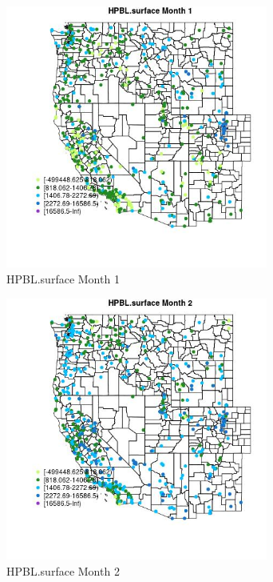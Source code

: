 \begin{figure} 
\centering  
\includegraphics[width=0.77\textwidth]{Code_Outputs/Report_ML_input_PM25_Step4_part_e_de_duplicated_aves_compiled_2019-05-14wNAs_MapObsMo1HPBLsurface.jpg} 
\caption{\label{fig:Report_ML_input_PM25_Step4_part_e_de_duplicated_aves_compiled_2019-05-14wNAsMapObsMo1HPBLsurface}HPBL.surface Month 1} 
\end{figure} 
 

\begin{figure} 
\centering  
\includegraphics[width=0.77\textwidth]{Code_Outputs/Report_ML_input_PM25_Step4_part_e_de_duplicated_aves_compiled_2019-05-14wNAs_MapObsMo2HPBLsurface.jpg} 
\caption{\label{fig:Report_ML_input_PM25_Step4_part_e_de_duplicated_aves_compiled_2019-05-14wNAsMapObsMo2HPBLsurface}HPBL.surface Month 2} 
\end{figure} 
 

